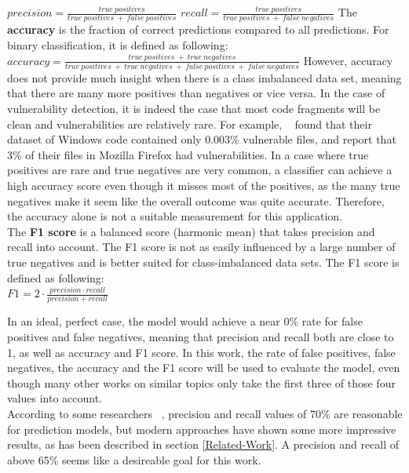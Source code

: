 \documentclass[
	a4paper,
	pagesize,
	pdftex,
	12pt,
	twoside, %
	BCOR=5mm, %
	ngerman,
	fleqn,
	final,
	]{scrartcl}
\begin{document}
\mbox{}\newline
$precision = \frac{true~positives}{true~positives~+~false~positives}$\newline
\mbox{}\newline
$recall = \frac{true~positives}{true~positives~+~false~negatives}$\newline
\mbox{}\newline
The \textbf{accuracy} is the fraction of correct predictions compared to all predictions. For binary classification, it is defined as following:  \newline
\mbox{}\newline
$accuracy = \frac{true~positives~+~true~negatives}{true~positives~+~true~negatives~+~false~positives~+~false~negatives}$\newline
\mbox{}\newline
However, accuracy does not provide much insight when there is a class imbalanced data set, meaning that there are many more positives than negatives or vice versa. In the case of vulnerability detection, it is indeed the case that most code fragments will be clean and vulnerabilities are relatively rare. For example, ~\cite{Morrison.2015} found that their dataset of Windows code contained only 0.003\% vulnerable files, and \cite{Shin.2010} report that 3\% of their files in Mozilla Firefox had vulnerabilities. In a case where true positives are rare and true negatives are very common, a classifier can achieve a high accuracy score even though it misses most of the positives, as the many true negatives make it seem like the overall outcome was quite accurate. Therefore, the accuracy alone is not a suitable measurement for this application.\\
The \textbf{F1 score} is a balanced score (harmonic mean) that takes precision and recall into account. The F1 score is not as easily influenced by a large number of true negatives and is better suited for class-imbalanced data sets. The F1 score is defined as following:\\
\mbox{}\newline
$F1 = 2 \cdot \frac{precision \cdot recall}{precision + recall}$
\mbox{}\newline

In an ideal, perfect case, the model would achieve a near 0\% rate for false positives and false negatives, meaning that precision and recall both are close to 1, as well as accuracy and F1 score. In this work, the rate of false positives, false negatives, the accuracy and the F1 score will be used to evaluate the model, even though many other works on similar topics only take the first three of those four values into account.\\
According to some researchers ~\cite{Morrison.2015,Shin.2013,Neuhaus.2007}, precision and recall values of 70\% are reasonable for prediction models, but modern approaches have shown some more impressive results, as has been described in section \ref{Related-Work}. A precision and recall of above 65\% seems like a desireable goal for this work.
\end{document}
